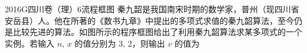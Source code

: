
\begin{problem}{2016}{G}{四川卷（理）}{6}{流程框图}
秦九韶是我国南宋时期的数学家，普州（现四川省安岳县）人。他在所著的《数书九章》中提出的多项式求值的秦九韶算法，至今仍是比较先进的算法。如图所示的程序框图给出了利用秦九韶算法求某多项式的一个实例。若输入 $ n $, $ x $ 的值分别为 $ 3 $, $ 2 $，则输出 $ v $ 的值为
\begin{choices}
\end{choices}
\end{problem}

\begin{answer}

\end{answer}

\begin{solutions}

\end{solutions}